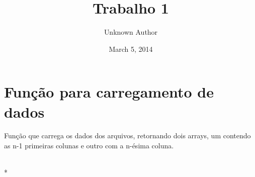 \documentclass[letterpaper,10pt,english]{/usr/local/lib/python2.7/dist-packages/sphinx/texinputs/sphinxhowto}
\title{Trabalho 1}
\date{March 5, 2014}
\author{Unknown Author}
\def\smaller{\fontsize{9.5pt}{9.5pt}\selectfont}
\begin{document}
        
            \maketitle
        

        


        
        \part{Função para carregamento de dados}
Função que carrega os dados dos arquivos, retornando dois arrays, um
contendo as n-1 primeiras colunas e outro com a n-ésima coluna.



    
        \vspace{6pt}
        \makebox[0.1\linewidth]{\smaller\hfill\tt\color{nbframe-in-prompt}In\hspace{4pt}{[}166{]}:\hspace{4pt}}\\*
        \vspace{-2.65\baselineskip}
\end{document}

